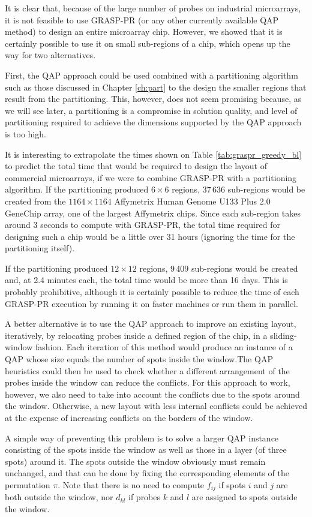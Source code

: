 It is clear that, because of the large number of probes on industrial
microarrays, it is not feasible to use GRASP-PR (or any other currently
available QAP method) to design an entire microarray chip. However, we showed
that it is certainly possible to use it on small sub-regions of a chip, which
opens up the way for two alternatives.

First, the QAP approach could be used combined with a partitioning algorithm
such as those discussed in Chapter \ref{ch:part} to the design the smaller
regions that result from the partitioning. This, however, does not seem
promising because, as we will see later, a partitioning is a compromise in
solution quality, and level of partitioning required to achieve the dimensions
supported by the QAP approach is too high.

It is interesting to extrapolate the times shown on Table
\ref{tab:graspr_greedy_bl} to predict the total time that would be required to
design the layout of commercial microarrays, if we were to combine GRASP-PR with
a partitioning algorithm. If the partitioning produced $6\times 6$ regions,
$37\,636$ sub-regions would be created from the $1164\times 1164$ Affymetrix
Human Genome U133 Plus 2.0 GeneChip array, one of the largest Affymetrix chips.
Since each sub-region takes around 3 seconds to compute with GRASP-PR, the total
time required for designing such a chip would be a little over 31 hours
(ignoring the time for the partitioning itself).

If the partitioning produced $12\times 12$ regions, $9\,409$ sub-regions would
be created and, at 2.4 minutes each, the total time would be more than 16 days.
This is probably prohibitive, although it is certainly possible to reduce the
time of each GRASP-PR execution by running it on faster machines or run them in
parallel.

A better alternative is to use the QAP approach to improve an existing layout,
iteratively, by relocating probes inside a defined region of the chip, in a
sliding-window fashion. Each iteration of this method would produce an instance
of a QAP whose size equals the number of spots inside the window.The QAP
heuristics could then be used to check whether a different arrangement of the
probes inside the window can reduce the conflicts. For this approach to work,
however, we also need to take into account the conflicts due to the spots around
the window. Otherwise, a new layout with less internal conflicts could be
achieved at the expense of increasing conflicts on the borders of the window.

A simple way of preventing this problem is to solve a larger QAP instance
consisting of the spots inside the window as well as those in a layer (of three
spots) around it. The spots outside the window obviously must remain unchanged,
and that can be done by fixing the corresponding elements of the permutation
$\pi$. Note that there is no need to compute $f_{ij}$ if spots $i$ and $j$ are
both outside the window, nor $d_{kl}$ if probes $k$ and $l$ are assigned to
spots outside the window.

